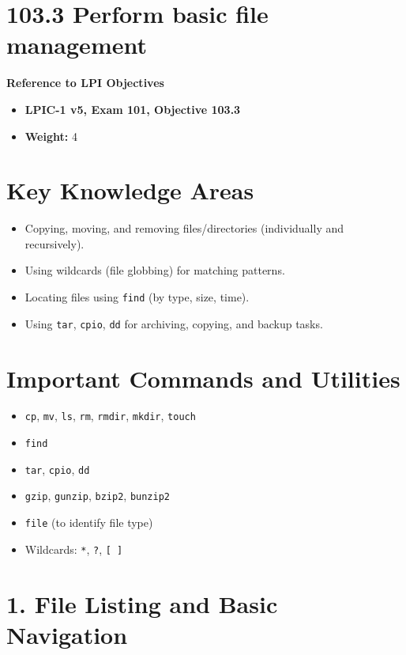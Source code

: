 \documentclass[a4paper]{report}
\begin{document}
\section*{103.3 Perform basic file management}

\textbf{Reference to LPI Objectives}
\begin{itemize}
    \item \textbf{LPIC-1 v5, Exam 101, Objective 103.3}
    \item \textbf{Weight:} 4
\end{itemize}

\section*{Key Knowledge Areas}
\begin{itemize}
    \item Copying, moving, and removing files/directories (individually and recursively).
    \item Using wildcards (file globbing) for matching patterns.
    \item Locating files using \texttt{find} (by type, size, time).
    \item Using \texttt{tar}, \texttt{cpio}, \texttt{dd} for archiving, copying, and backup tasks.
\end{itemize}

\section*{Important Commands and Utilities}
\begin{itemize}
    \item \texttt{cp}, \texttt{mv}, \texttt{ls}, \texttt{rm}, \texttt{rmdir}, \texttt{mkdir}, \texttt{touch}
    \item \texttt{find}
    \item \texttt{tar}, \texttt{cpio}, \texttt{dd}
    \item \texttt{gzip}, \texttt{gunzip}, \texttt{bzip2}, \texttt{bunzip2}
    \item \texttt{file} (to identify file type)
    \item Wildcards: \texttt{*}, \texttt{?}, \texttt{[ ]}
\end{itemize}

\section*{1. File Listing and Basic Navigation}
\end{document}
